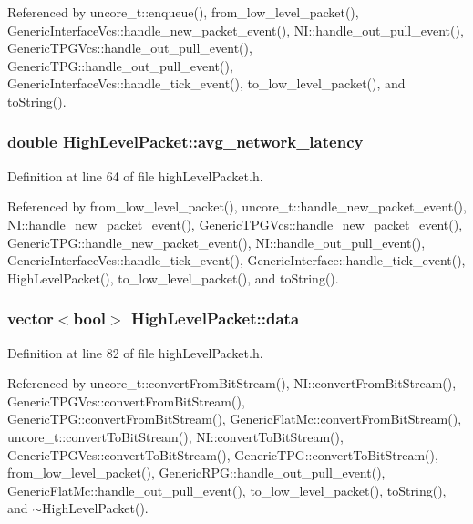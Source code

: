 Referenced by uncore\_\-t::enqueue(), from\_\-low\_\-level\_\-packet(), GenericInterfaceVcs::handle\_\-new\_\-packet\_\-event(), NI::handle\_\-out\_\-pull\_\-event(), GenericTPGVcs::handle\_\-out\_\-pull\_\-event(), GenericTPG::handle\_\-out\_\-pull\_\-event(), GenericInterfaceVcs::handle\_\-tick\_\-event(), to\_\-low\_\-level\_\-packet(), and toString().
\subsubsection[{avg\_\-network\_\-latency}]{\setlength{\rightskip}{0pt plus 5cm}double {\bf HighLevelPacket::avg\_\-network\_\-latency}}\label{classHighLevelPacket_6586c04ecd2c2c5ad01f0f4433f2b77a}




Definition at line 64 of file highLevelPacket.h.

Referenced by from\_\-low\_\-level\_\-packet(), uncore\_\-t::handle\_\-new\_\-packet\_\-event(), NI::handle\_\-new\_\-packet\_\-event(), GenericTPGVcs::handle\_\-new\_\-packet\_\-event(), GenericTPG::handle\_\-new\_\-packet\_\-event(), NI::handle\_\-out\_\-pull\_\-event(), GenericInterfaceVcs::handle\_\-tick\_\-event(), GenericInterface::handle\_\-tick\_\-event(), HighLevelPacket(), to\_\-low\_\-level\_\-packet(), and toString().
\subsubsection[{data}]{\setlength{\rightskip}{0pt plus 5cm}vector$<$bool$>$ {\bf HighLevelPacket::data}}\label{classHighLevelPacket_340b7688df206e49a62301e2dae093de}




Definition at line 82 of file highLevelPacket.h.

Referenced by uncore\_\-t::convertFromBitStream(), NI::convertFromBitStream(), GenericTPGVcs::convertFromBitStream(), GenericTPG::convertFromBitStream(), GenericFlatMc::convertFromBitStream(), uncore\_\-t::convertToBitStream(), NI::convertToBitStream(), GenericTPGVcs::convertToBitStream(), GenericTPG::convertToBitStream(), from\_\-low\_\-level\_\-packet(), GenericRPG::handle\_\-out\_\-pull\_\-event(), GenericFlatMc::handle\_\-out\_\-pull\_\-event(), to\_\-low\_\-level\_\-packet(), toString(), and $\sim$HighLevelPacket().
